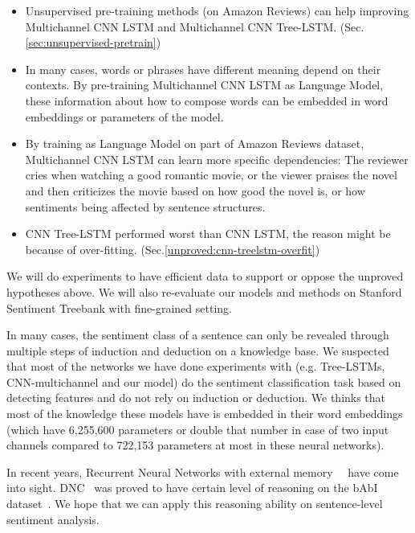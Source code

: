 \begin{itemize}
\item Unsupervised pre-training methods (on Amazon Reviews) can help improving Multichannel CNN LSTM and Multichannel CNN Tree-LSTM. (Sec.\ref{sec:unsupervised-pretrain})

\item In many cases, words or phrases have different meaning depend on their contexts.
By pre-training Multichannel CNN LSTM as Language Model, these information about how to compose words can be embedded in word embeddings or parameters of the model.

\item By training as Language Model on part of Amazon Reviews dataset, Multichannel CNN LSTM can learn more specific dependencies: The reviewer cries when watching a good romantic movie, or the viewer praises the novel and then criticizes the movie based on how good the novel is, or how sentiments being affected by sentence structures. 

\item CNN Tree-LSTM performed worst than CNN LSTM, the reason might be because of over-fitting. (Sec.\ref{unproved:cnn-treelstm-overfit})
\end{itemize}

We will do experiments to have efficient data to support or oppose the unproved hypotheses above.
We will also re-evaluate our models and methods on Stanford Sentiment Treebank with fine-grained setting.

In many cases, the sentiment class of a sentence can only be revealed through multiple steps of induction and deduction on a knowledge base.
We suspected that most of the networks we have done experiments with (e.g. Tree-LSTMs, CNN-multichannel and our model) do the sentiment classification task based on detecting features and do not rely on induction or deduction.
We thinks that most of the knowledge these models have is embedded in their word embeddings (which have 6,255,600 parameters or double that number in case of two input channels compared to 722,153 parameters at most in these neural networks).

In recent years, Recurrent Neural Networks with external memory~\cite{Graves_Nature2016}~\cite{neural-turing-machine} have come into sight.
DNC~\cite{Graves_Nature2016} was proved to have certain level of reasoning on the bAbI dataset~\cite{bAbi}.
We hope that we can apply this reasoning ability on sentence-level sentiment analysis.
